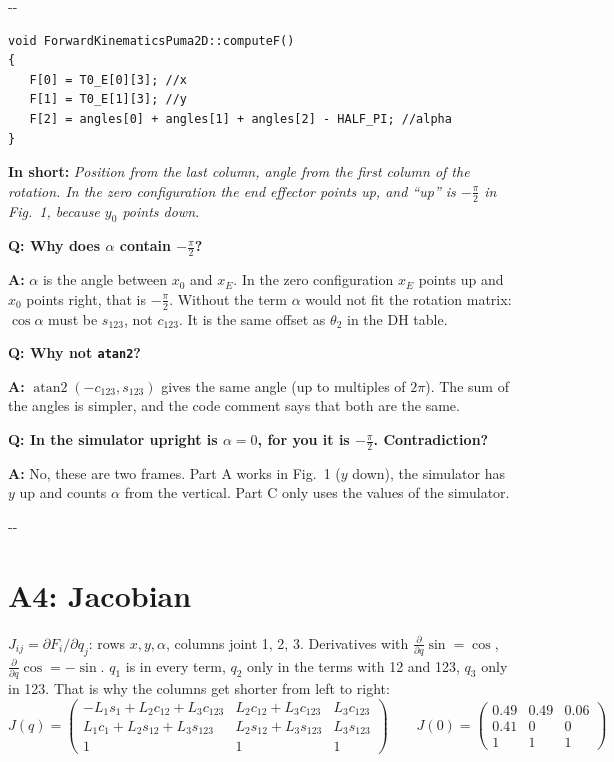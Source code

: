\documentclass[10pt,a4paper]{article}
\makeatletter
\newcommand{\secneed}[1]{\par\penalty\@M\begingroup\setlength{\dimen@}{#1}\dimen@ii\pagegoal
  \advance\dimen@ii-\pagetotal\ifdim\dimen@>\dimen@ii\ifdim\dimen@ii>\z@\vfil\fi\penalty-\@M\fi\endgroup}
\let\oldsection\section
\renewcommand{\section}{\secneed{9\baselineskip}\oldsection}
\newcommand{\frage}[2]{\textbf{Q: #1}\par\nopagebreak\vspace{1pt}\textbf{A:} #2\par\vspace{5pt}}
\newcommand{\sagen}[1]{\textbf{In short:} \emph{#1}\par}
\newcommand{\code}[1]{\texttt{#1}}
\makeatother
\begin{document}
\secneed{7\baselineskip}
\begin{lstlisting}[firstnumber=351]
void ForwardKinematicsPuma2D::computeF()
{
   F[0] = T0_E[0][3]; //x
   F[1] = T0_E[1][3]; //y
   F[2] = angles[0] + angles[1] + angles[2] - HALF_PI; //alpha
}
\end{lstlisting}

\sagen{Position from the last column, angle from the first column of the rotation. In the zero configuration the end
effector points up, and ``up'' is $-\frac{\pi}{2}$ in Fig.~1, because $y_0$ points down.}

\begin{fragen}
\frage{Why does $\alpha$ contain $-\frac{\pi}{2}$?}
{$\alpha$ is the angle between $x_0$ and $x_E$. In the zero configuration $x_E$ points up and $x_0$ points right, that is
$-\frac{\pi}{2}$. Without the term $\alpha$ would not fit the rotation matrix: $\cos\alpha$ must be $s_{123}$, not
$c_{123}$. It is the same offset as $\theta_2$ in the DH table.}
\frage{Why not \code{atan2}?}
{$\operatorname{atan2}(-c_{123}, s_{123})$ gives the same angle (up to multiples of $2\pi$). The sum of the angles is
simpler, and the code comment says that both are the same.}
\frage{In the simulator upright is $\alpha = 0$, for you it is $-\frac{\pi}{2}$. Contradiction?}
{No, these are two frames. Part A works in Fig.~1 ($y$ down), the simulator has $y$ up and counts $\alpha$ from the
vertical. Part C only uses the values of the simulator.}
\end{fragen}

\section{A4: Jacobian}

$J_{ij} = \partial F_i / \partial q_j$: rows $x, y, \alpha$, columns joint 1, 2, 3. Derivatives with
$\frac{\partial}{\partial q}\sin = \cos$, $\frac{\partial}{\partial q}\cos = -\sin$. $q_1$ is in every term, $q_2$ only in
the terms with 12 and 123, $q_3$ only in 123. That is why the columns get shorter from left to right:
\[
  \boxed{
  J(q) =
  \begin{pmatrix}
    -L_1 s_1 + L_2 c_{12} + L_3 c_{123} & L_2 c_{12} + L_3 c_{123} & L_3 c_{123} \\
    L_1 c_1 + L_2 s_{12} + L_3 s_{123} & L_2 s_{12} + L_3 s_{123} & L_3 s_{123} \\
    1 & 1 & 1
  \end{pmatrix}}
  \qquad
  J(0) = \begin{pmatrix} 0.49 & 0.49 & 0.06 \\ 0.41 & 0 & 0 \\ 1 & 1 & 1 \end{pmatrix}
\]
\end{document}
